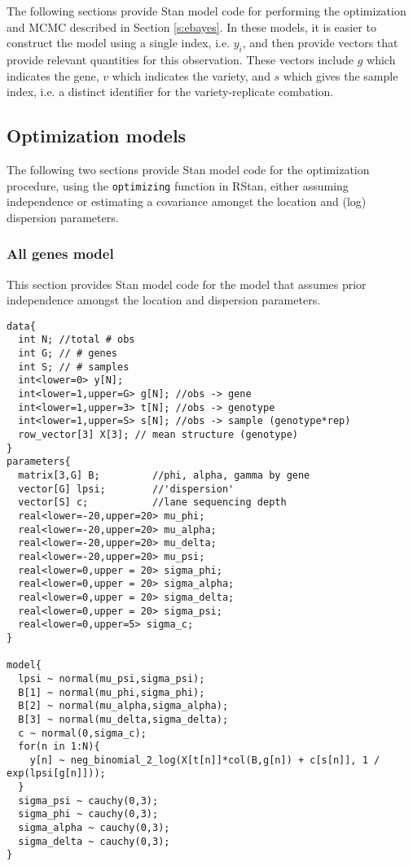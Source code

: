 
The following sections provide Stan model code for performing the optimization and MCMC described in Section \ref{s:ebayes}. In these models, it is easier to construct the model using a single index, i.e. $y_i$, and then provide vectors that provide relevant quantities for this observation. These vectors include $g$ which indicates the gene, $v$ which indicates the variety, and $s$ which gives the sample index, i.e. a distinct identifier for the variety-replicate combation. 

\subsection{Optimization models}

The following two sections provide Stan model code for the optimization procedure, using the {\tt optimizing} function in RStan, either assuming independence or estimating a covariance amongst the location and (log) dispersion parameters. 

\subsubsection{All genes model}
\label{s:all_genes_model}

This section provides Stan model code for the model that assumes prior independence amongst the location and dispersion parameters. 

\begin{verbatim}
data{
  int N; //total # obs
  int G; // # genes
  int S; // # samples
  int<lower=0> y[N];
  int<lower=1,upper=G> g[N]; //obs -> gene
  int<lower=1,upper=3> t[N]; //obs -> genotype
  int<lower=1,upper=S> s[N]; //obs -> sample (genotype*rep)
  row_vector[3] X[3]; // mean structure (genotype)
}
parameters{
  matrix[3,G] B;         //phi, alpha, gamma by gene
  vector[G] lpsi;        //'dispersion'
  vector[S] c;           //lane sequencing depth
  real<lower=-20,upper=20> mu_phi;
  real<lower=-20,upper=20> mu_alpha;
  real<lower=-20,upper=20> mu_delta;
  real<lower=-20,upper=20> mu_psi;
  real<lower=0,upper = 20> sigma_phi;
  real<lower=0,upper = 20> sigma_alpha;
  real<lower=0,upper = 20> sigma_delta;
  real<lower=0,upper = 20> sigma_psi;
  real<lower=0,upper=5> sigma_c;
}

model{
  lpsi ~ normal(mu_psi,sigma_psi);
  B[1] ~ normal(mu_phi,sigma_phi);
  B[2] ~ normal(mu_alpha,sigma_alpha);
  B[3] ~ normal(mu_delta,sigma_delta);
  c ~ normal(0,sigma_c);
  for(n in 1:N){
    y[n] ~ neg_binomial_2_log(X[t[n]]*col(B,g[n]) + c[s[n]], 1 / exp(lpsi[g[n]]));
  }
  sigma_psi ~ cauchy(0,3);
  sigma_phi ~ cauchy(0,3);
  sigma_alpha ~ cauchy(0,3);
  sigma_delta ~ cauchy(0,3);
}
\end{verbatim}

